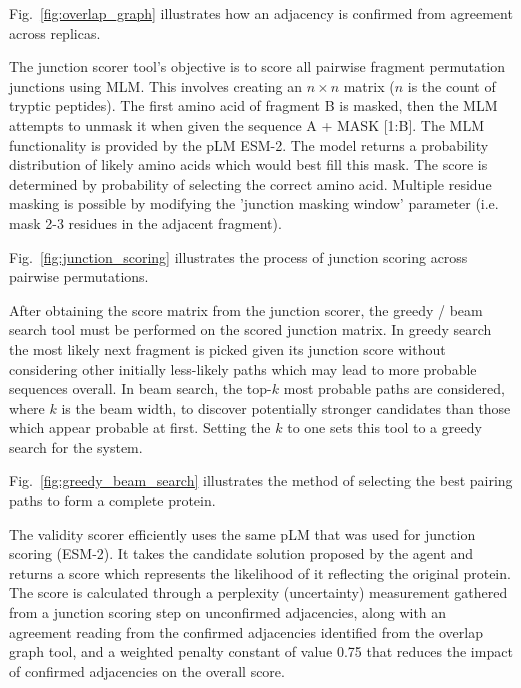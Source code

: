 \documentclass[journal]{IEEEtran}
\begin{document}
Fig.~\ref{fig:overlap_graph} illustrates how an adjacency is confirmed from agreement across replicas.



The junction scorer tool's objective is to score all pairwise fragment permutation junctions using
MLM. This involves creating an $n \times n$ matrix ($n$ is the count of
tryptic peptides). The first amino acid of fragment B is masked, then the MLM attempts to unmask it
when given the sequence A + MASK [1:B].
The MLM functionality is provided by the pLM ESM-2. The
model returns a probability distribution of likely amino acids which would best fill this mask.
The score is determined by probability of selecting the correct amino acid. Multiple residue masking is possible
by modifying the 'junction masking window' parameter (i.e. mask 2-3 residues in the adjacent fragment).

Fig.~\ref{fig:junction_scoring} illustrates the process of junction scoring across pairwise permutations.



After obtaining the score matrix from the junction scorer, the greedy / beam search tool must
be performed on the scored junction matrix.
In greedy search the most likely next fragment is picked given its junction score without considering
other initially less-likely paths which may lead to more probable sequences overall. 
In beam search, the top-$k$ most probable paths
are considered, where $k$ is the beam width, to discover potentially stronger candidates than
those which appear probable at first. Setting the $k$ to one sets this tool to a greedy search for the system.

Fig.~\ref{fig:greedy_beam_search} illustrates the method of selecting the best pairing paths to form a complete protein.



The validity scorer efficiently uses the same pLM that was used for junction scoring (ESM-2).
It takes the candidate solution proposed by the agent and returns a score which represents the likelihood of it 
reflecting the original protein. The score is
calculated through a perplexity (uncertainty) measurement gathered from a junction scoring step on unconfirmed adjacencies,
along with an agreement reading from the confirmed adjacencies identified from the overlap graph tool, and a weighted
penalty constant of value 0.75 that reduces the impact of confirmed adjacencies on the overall score.
\end{document}
